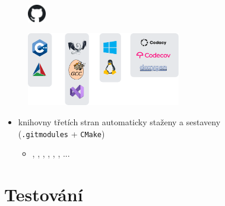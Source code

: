 \documentclass[compress]{beamer}
\begin{document}
\begin{frame}
	\vspace{-0.5cm}
	\begin{figure}
		\centering
		\includegraphics[width=0.07\textwidth]{img/logos/github.pdf}
	\end{figure}
	\centering
	\vspace{-0.4cm}
	\href{https://github.com/silhavyj/ZeroMate}{}
	\vspace{-0.1cm}
	\noindent\makebox[\linewidth]{\rule{\textwidth}{0.4pt}}
	\begin{figure}
		\centering
		\includegraphics[width=0.6\textwidth]{img/logos/logos.pdf}
	\end{figure}
	\vspace{-0.6cm}
	\noindent\makebox[\linewidth]{\rule{\textwidth}{0.4pt}}
	\vspace{-0.3cm}
	\begin{itemize}
		\item knihovny třetích stran automaticky staženy a sestaveny \\ (\texttt{.gitmodules} + \texttt{CMake})
		\begin{itemize}
			\item \href{https://github.com/google/googletest}{}, \href{https://github.com/ocornut/imgui}{}, 
			\href{https://github.com/martin-olivier/dylib}{}, 
			\href{https://github.com/serge1/ELFIO}{}, 
			\href{https://github.com/glfw/glfw}{}, 
			\href{https://github.com/capstone-engine/capstone}{}, ...
		\end{itemize}
	\end{itemize}
\end{frame}

\section{Testování}
\end{document}
